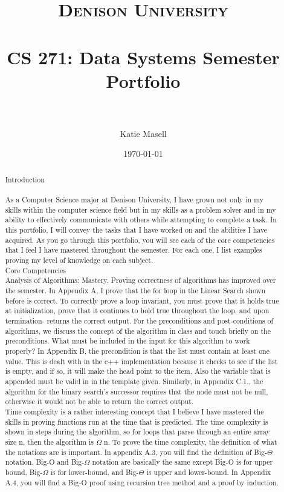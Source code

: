\documentclass[paper=a4, fontsize=11pt]{scrartcl} %
\title{	
\normalfont \normalsize 
\textsc{Denison University} \\ [25pt] %
\horrule{0.5pt} \\[0.4cm] %
\huge  CS 271: Data Systems Semester Portfolio \\ %
\
}
\author{Katie Masell} %
\date{\normalsize\today} %
\numberwithin{equation}{section} %
\numberwithin{figure}{section} %
\numberwithin{table}{section} %
\begin{document}
\maketitle %

\newpage


\newpage



\begin{abstract}

Introduction
\\
\\
As a Computer Science major at Denison University, I have grown not only in my skills within the computer science field but in my skills as a problem solver and in my ability to effectively communicate with others while attempting to complete a task.  In this portfolio, I will convey the tasks that I have worked on and the abilities I have acquired.  As you go through this portfolio, you will see each of the core competencies that I feel I have mastered throughout the semester.  For each one, I list examples proving my level of knowledge on each subject.  
\\ 
Core Competencies
\\
\indent Analysis of Algorithms: Mastery.  Proving correctness of algorithms has improved over the semester.  In Appendix A, I prove that the for loop in the Linear Search shown before is correct.  To correctly prove a loop invariant, you must prove that it holds true at initialization, prove that it continues to hold true throughout the loop, and upon termination- returns the correct output.  
For the preconditions and post-conditions of algorithms, we discuss the concept of the algorithm in class and touch briefly on the preconditions.  What must be included in the input for this algorithm to work properly? In Appendix B, the precondition is that the list must contain at least one value.  This is dealt with in the c++ implementation because it checks to see if the list is empty, and if so, it will make the head point to the item.  Also the variable that is appended must be valid in in the template given.  Similarly, in Appendix C.1., the algorithm for the binary search's successor requires that the node must not be null, otherwise it would not be able to return the correct output.  
\\
Time complexity is a rather interesting concept that I believe I have mastered the skills in proving functions run at the time that is predicted.  The time complexity is shown in steps during the algorithm, so for loops that parse through an entire array size n, then the algorithm is $\Omega$ n.  To prove the time complexity, the definition of what the notations are is important.  In appendix A.3, you will find the definition of Big-$\Theta$ notation.  Big-O and Big-$\Omega$ notation are basically the same except Big-O is for upper bound, Big-$\Omega$ is for lower-bound, and Big-$\Theta$ is upper and lower-bound.  In Appendix A.4, you will find a Big-O proof using recursion tree method and a proof by induction.   

\end{abstract}
\end{document}
